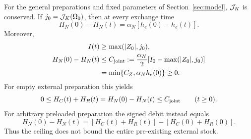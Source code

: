 \begin{theorem}\label{thm:projection}%
For the general preparations and fixed parameters of Section~\ref{sec:model}, $\mathcal J_K$ is conserved. If $j_0=\mathcal J_K(\Omega_0)$, then at every exchange time
\begin{equation}\label{eq:debit}%
H_N(0)-H_N(t)=\alpha_N[h_e(0)-h_e(t)].
\end{equation}
Moreover,
\begin{equation}\label{eq:joint}%
\begin{aligned}
I(t)&\ge\max(|Z_0|,j_0),\\
H_N(0)-H_N(t)&\le C_{\rm joint}
:=\frac{\alpha_N}{2}[I_0-\max(|Z_0|,j_0)]\\
&=\min\{C_Z,\alpha_Nh_e(0)\}\ge0 .
\end{aligned}
\end{equation}
For empty external preparation this yields
\begin{equation}\label{eq:emptystock}%
0\le H_C(t)+H_R(t)=H_N(0)-H_N(t)\le C_{\rm joint}\qquad(t\ge0).
\end{equation}
For arbitrary preloaded preparation the signed debit instead equals
\begin{equation}\label{eq:preloaded}%
H_N(0)-H_N(t)
=[H_C(t)+H_R(t)]-[H_C(0)+H_R(0)] .
\end{equation}
Thus the ceiling does not bound the entire pre-existing external stock.
\end{theorem}
